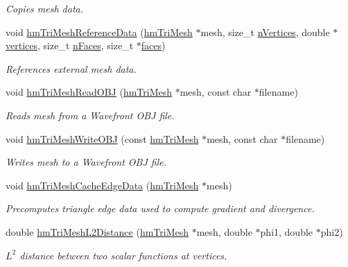 \begin{DoxyCompactItemize}
\begin{DoxyCompactList}\small\item\em Copies mesh data. \end{DoxyCompactList}\item 
void \hyperlink{structhm_tri_mesh_a94fe27953eb8030538a09f320defb51a}{hm\-Tri\-Mesh\-Reference\-Data} (\hyperlink{structhm_tri_mesh}{hm\-Tri\-Mesh} $\ast$mesh, size\-\_\-t \hyperlink{structhm_tri_mesh_aad9ed5da071bc7451fa5f5aeac7c1814}{n\-Vertices}, double $\ast$\hyperlink{structhm_tri_mesh_a7374e0ae5c0af9c7c42f1293643c691e}{vertices}, size\-\_\-t \hyperlink{structhm_tri_mesh_a38de205b6938c9e0db72ac866a803be3}{n\-Faces}, size\-\_\-t $\ast$\hyperlink{structhm_tri_mesh_ac0ddc0ca3b34698286793c9336af359d}{faces})
\begin{DoxyCompactList}\small\item\em References external mesh data. \end{DoxyCompactList}\item 
void \hyperlink{structhm_tri_mesh_ad57fca68a2c3293d8a94c329cea76382}{hm\-Tri\-Mesh\-Read\-O\-B\-J} (\hyperlink{structhm_tri_mesh}{hm\-Tri\-Mesh} $\ast$mesh, const char $\ast$filename)
\begin{DoxyCompactList}\small\item\em Reads mesh from a Wavefront O\-B\-J file. \end{DoxyCompactList}\item 
void \hyperlink{structhm_tri_mesh_a41d3b0a8052634a2b5cc44e0cd58a467}{hm\-Tri\-Mesh\-Write\-O\-B\-J} (const \hyperlink{structhm_tri_mesh}{hm\-Tri\-Mesh} $\ast$mesh, const char $\ast$filename)
\begin{DoxyCompactList}\small\item\em Writes mesh to a Wavefront O\-B\-J file. \end{DoxyCompactList}\item 
void \hyperlink{structhm_tri_mesh_a4d7110353aaeb9eec6fa69a5a944a4cb}{hm\-Tri\-Mesh\-Cache\-Edge\-Data} (\hyperlink{structhm_tri_mesh}{hm\-Tri\-Mesh} $\ast$mesh)
\begin{DoxyCompactList}\small\item\em Precomputes triangle edge data used to compute gradient and divergence. \end{DoxyCompactList}\item 
double \hyperlink{structhm_tri_mesh_a5a33fe6327f51c99d5fc68a7c72b4336}{hm\-Tri\-Mesh\-L2\-Distance} (\hyperlink{structhm_tri_mesh}{hm\-Tri\-Mesh} $\ast$mesh, double $\ast$phi1, double $\ast$phi2)
\begin{DoxyCompactList}\small\item\em $L^2$ distance between two scalar functions at vertices. \end{DoxyCompactList}\item 

\end{DoxyCompactItemize}
